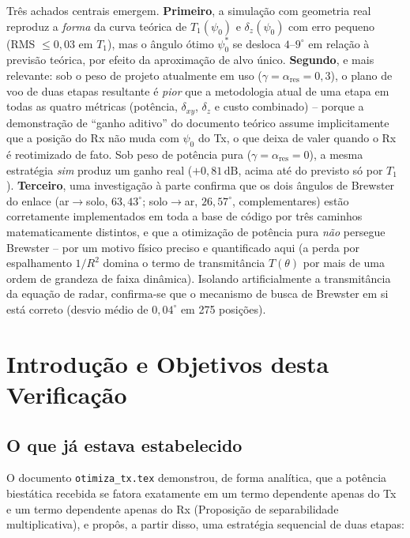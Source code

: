\documentclass[12pt,a4paper,oneside]{book}
\theoremstyle{definition}
\theoremstyle{remark}
\newcommand{\dxy}{\delta_{xy}}
\newcommand{\dz}{\delta_z}
\begin{document}
Três achados centrais emergem. \textbf{Primeiro}, a simulação com geometria
real reproduz a \emph{forma} da curva teórica de $T_1(\psi_0)$ e
$\dz(\psi_0)$ com erro pequeno (RMS $\le 0{,}03$ em $T_1$), mas o ângulo
ótimo $\psi_0^*$ se desloca $4$--$9^\circ$ em relação à previsão teórica,
por efeito da aproximação de alvo único. \textbf{Segundo}, e mais
relevante: sob o peso de projeto atualmente em uso ($\gamma=\alpha_{\mathrm{res}}=0{,}3$),
o plano de voo de duas etapas resultante é \emph{pior} que a metodologia
atual de uma etapa em todas as quatro métricas (potência, $\dxy$, $\dz$ e
custo combinado) -- porque a demonstração de ``ganho aditivo'' do documento
teórico assume implicitamente que a posição do Rx não muda com $\psi_0$ do
Tx, o que deixa de valer quando o Rx é reotimizado de fato. Sob peso de
potência pura ($\gamma=\alpha_{\mathrm{res}}=0$), a mesma estratégia
\emph{sim} produz um ganho real ($+0{,}81\,\mathrm{dB}$, acima até do
previsto só por $T_1$). \textbf{Terceiro}, uma investigação à parte
confirma que os dois ângulos de Brewster do enlace (ar$\to$solo,
$63{,}43^\circ$; solo$\to$ar, $26{,}57^\circ$, complementares) estão
corretamente implementados em toda a base de código por três caminhos
matematicamente distintos, e que a otimização de potência pura
\emph{não} persegue Brewster -- por um motivo físico preciso e
quantificado aqui (a perda por espalhamento $1/R^2$ domina o termo de
transmitância $T(\theta)$ por mais de uma ordem de grandeza de faixa
dinâmica). Isolando artificialmente a transmitância da equação de radar,
confirma-se que o mecanismo de busca de Brewster em si está correto
(desvio médio de $0{,}04^\circ$ em 275 posições).

\tableofcontents

\mainmatter

\chapter{Introdução e Objetivos desta Verificação}

\section{O que já estava estabelecido}

O documento \texttt{otimiza\_tx.tex} demonstrou, de forma analítica, que a
potência biestática recebida se fatora exatamente em um termo dependente
apenas do Tx e um termo dependente apenas do Rx (Proposição de
separabilidade multiplicativa), e propôs, a partir disso, uma estratégia
sequencial de duas etapas:
\end{document}
